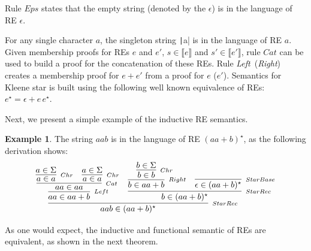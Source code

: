 \documentclass[oneside,12pt]{scrbook}
\theoremstyle{definition}
\newtheorem{Example}{Example}
\newcommand{\Eps}{\textit{Eps}}
\newcommand{\Catt}{\textit{Cat}}
\newcommand{\Left}{\textit{Left}}
\newcommand{\Right}{\textit{Right}}
\newcommand{\sembrackets}[1]{\ensuremath{\llbracket #1 \rrbracket}}
\newcommand{\coq}[1]{\texttt|#1|}
\theoremstyle{plain}
\theoremstyle{definition}
\begin{document}
Rule $\Eps$ states that the empty string (denoted by the $\epsilon$)
is in the language of RE $\epsilon$.

For any single character $a$, the singleton string \coq{a} is in the language 
of RE $a$. Given membership proofs for REs $e$ and $e'$, $s \in \sembrackets{e}$ 
and $s' \in\sembrackets{e'}$, rule $\Catt$ can be used to build a proof
for the concatenation of these REs.  Rule \Left~(\Right) creates a membership proof
for $e + e'$ from a proof for $e$ ($e'$). Semantics for Kleene star
is built using the following well known equivalence of REs: $e^\star
= \epsilon + e\,e^\star$. 

Next, we present a simple example of the inductive RE semantics.

\begin{Example}
	The string $aab$ is in the language of RE $(aa + b)^\star$, as the following derivation shows:
	\begin{equation*}
	\infer[_{StarRec}]{aab \in (aa + b)^\star}
	{
		\infer[_{Left}]{aa \in aa + b}
		{
			\infer[_{Cat}]{aa \in aa}
			{
				\infer[_{Chr}]{a \in a}{a \in \Sigma} &
				\infer[_{Chr}]{a \in a}{a \in \Sigma}
			}
		}
		&
		\infer[_{StarRec}]{b \in (aa + b)^\star}
		{
			\infer[_{Right}]{b \in aa + b}
			{
				\infer[_{Chr}]{b \in b}{b \in \Sigma}
			}
			&
			\infer[_{StarBase}]{\epsilon \in (aa + b)^\star}{}
		}
	}
	\end{equation*}
\end{Example}

As one would expect, the inductive and functional semantic of REs are equivalent, as shown in the next theorem.
\end{document}
